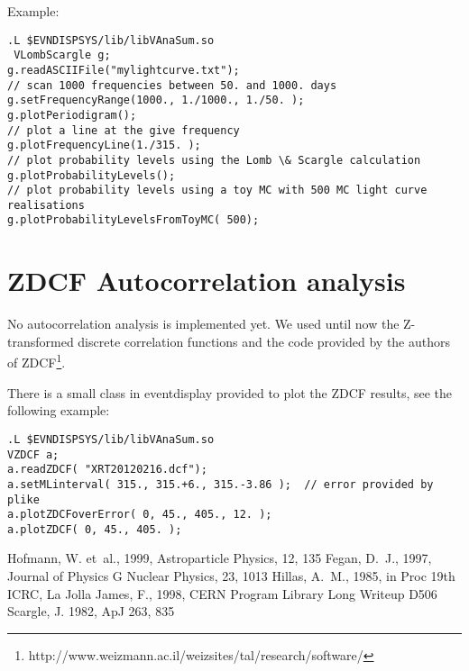 \documentclass[titlepage,a4paper,twoside,11pt]{report}
\begin{document}
Example:

\begin{lstlisting}
.L $EVNDISPSYS/lib/libVAnaSum.so 
 VLombScargle g;
g.readASCIIFile("mylightcurve.txt");
// scan 1000 frequencies between 50. and 1000. days
g.setFrequencyRange(1000., 1./1000., 1./50. );
g.plotPeriodigram();
// plot a line at the give frequency
g.plotFrequencyLine(1./315. );
// plot probability levels using the Lomb \& Scargle calculation
g.plotProbabilityLevels();
// plot probability levels using a toy MC with 500 MC light curve realisations
g.plotProbabilityLevelsFromToyMC( 500);
\end{lstlisting}

\section{ZDCF Autocorrelation analysis}

No autocorrelation analysis is implemented yet. We used until now the Z-transformed discrete correlation functions and the code provided by the authors of ZDCF\footnote{http://www.weizmann.ac.il/weizsites/tal/research/software/}.

There is a small class in eventdisplay provided to plot the ZDCF results, see the following example:

\begin{lstlisting}
.L $EVNDISPSYS/lib/libVAnaSum.so 
VZDCF a;
a.readZDCF( "XRT20120216.dcf");
a.setMLinterval( 315., 315.+6., 315.-3.86 );  // error provided by plike
a.plotZDCFoverError( 0, 45., 405., 12. );
a.plotZDCF( 0, 45., 405. );
\end{lstlisting}






%
%
%


\begin{thebibliography}{}
  Hofmann, W. et~al., 1999, Astroparticle Physics, 12, 135
  Fegan, D.~J., 1997, Journal of Physics G Nuclear Physics, 23, 1013
  Hillas, A.~M., 1985, in Proc 19th ICRC, La Jolla 
  James, F., 1998, CERN Program Library Long Writeup D506
  Scargle, J. 1982, ApJ 263, 835

\end{thebibliography}
\end{document}

